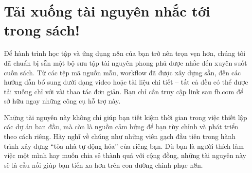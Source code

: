 \documentclass[a4paper,12pt,oneside]{book}
\begin{document}
\newpage

\section*{Tải xuống tài nguyên nhắc tới trong sách!}
    
\begin{center}
    
\end{center}


Để hành trình học tập và ứng dụng n8n của bạn trở nên trọn vẹn hơn, chúng tôi đã chuẩn bị sẵn một bộ sưu tập tài nguyên phong phú được nhắc đến xuyên suốt cuốn sách. Từ các tệp mã nguồn mẫu, workflow đã được xây dựng sẵn, đến các hướng dẫn bổ sung dưới dạng video hoặc tài liệu chi tiết – tất cả đều có thể được tải xuống chỉ với vài thao tác đơn giản. Bạn chỉ cần truy cập link sau \href{fb.com}{fb.com} để sở hữu ngay những công cụ hỗ trợ này.

Những tài nguyên này không chỉ giúp bạn tiết kiệm thời gian trong việc thiết lập các dự án ban đầu, mà còn là nguồn cảm hứng để bạn tùy chỉnh và phát triển theo cách riêng. Hãy nghĩ về chúng như những viên gạch đầu tiên trong hành trình xây dựng “tòa nhà tự động hóa” của riêng bạn. Dù bạn là người thích làm việc một mình hay muốn chia sẻ thành quả với cộng đồng, những tài nguyên này sẽ là cầu nối giúp bạn tiến xa hơn trên con đường chinh phục n8n.
\end{document}
